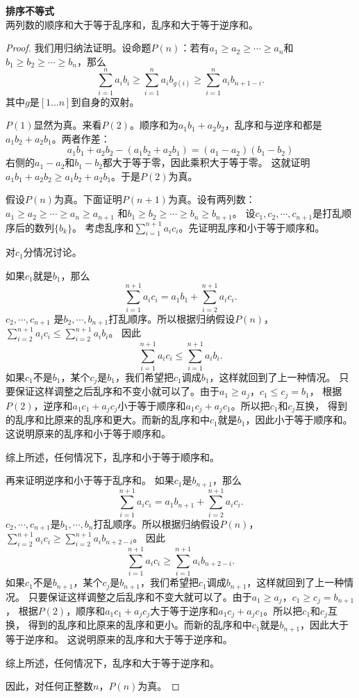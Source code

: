 \documentclass[12pt,UTF8,fontset=none]{ctexbook}
\begin{document}
\begin{tm}\textbf{排序不等式}\\
    两列数的顺序和大于等于乱序和，乱序和大于等于逆序和。
\end{tm}
\begin{proof}
    我们用归纳法证明。设命题$P(n)$：若有$a_1 \geqslant a_2 \geqslant \cdots \geqslant a_n$和
    $b_1 \geqslant b_2 \geqslant \cdots \geqslant b_n$，那么
    $$ \sum_{i=1}^n a_ib_i \geqslant \sum_{i=1}^n a_ib_{g(i)} \geqslant \sum_{i=1}^n a_ib_{n+1-i} . $$
    其中$g$是$[1\dots n]$到自身的双射。

    $P(1)$显然为真。来看$P(2)$。顺序和为$a_1b_1 + a_2b_2$，乱序和与逆序和都是$a_1b_2 + a_2b_1$。两者作差：
    $$ a_1b_1 + a_2b_2 - (a_1b_2 + a_2b_1) = (a_1 - a_2)(b_1 - b_2) $$
    右侧的$a_1-a_2$和$b_1-b_2$都大于等于零，因此乘积大于等于零。
    这就证明$a_1b_1 + a_2b_2 \geqslant a_1b_2 + a_2b_1$。于是$P(2)$为真。

    假设$P(n)$为真。下面证明$P(n+1)$为真。设有两列数：
    $a_1 \geqslant a_2 \geqslant \cdots \geqslant a_n\geqslant a_{n+1}$
    和$b_1 \geqslant b_2 \geqslant \cdots \geqslant b_n \geqslant b_{n+1}$。
    设$c_1, c_2, \cdots , c_{n+1}$是打乱顺序后的数列$\{b_k\}$。
    考虑乱序和$\sum_{i=1}^{n+1} a_i c_i$。先证明乱序和小于等于顺序和。

    对$c_{1}$分情况讨论。

    如果$c_1$就是$b_1$，那么
    $$\sum_{i=1}^{n+1} a_i c_i = a_1b_1 + \sum_{i=2}^{n+1} a_i c_i.$$
    $c_2, \cdots, c_{n+1}$
    是$b_2, \cdots, b_{n+1}$打乱顺序。所以根据归纳假设$P(n)$，
    $\sum_{i=2}^{n+1} a_i c_i \leqslant \sum_{i=2}^{n+1} a_i b_i$。
    因此
    $$\sum_{i=1}^{n+1} a_i c_i \leqslant \sum_{i=1}^{n+1} a_i b_i.$$
    如果$c_1$不是$b_1$，某个$c_j$是$b_1$，我们希望把$c_1$调成$b_1$，这样就回到了上一种情况。
    只要保证这样调整之后乱序和不变小就可以了。由于$a_1 \geqslant a_j$，$c_1 \leqslant c_j = b_1$，
    根据$P(2)$，逆序和$a_1c_1 + a_jc_j$小于等于顺序和$a_1c_j + a_jc_1$。所以把$c_1$和$c_j$互换，
    得到的乱序和比原来的乱序和更大。而新的乱序和中$c_1$就是$b_1$，因此小于等于顺序和。
    这说明原来的乱序和小于等于顺序和。

    综上所述，任何情况下，乱序和小于等于顺序和。

    再来证明逆序和小于等于乱序和。
    如果$c_1$是$b_{n+1}$，那么
    $$\sum_{i=1}^{n+1} a_i c_i = a_1b_{n+1} + \sum_{i=2}^{n+1} a_i c_i.$$
    $c_2, \cdots, c_{n+1}$是$b_1, \cdots, b_{n}$打乱顺序。所以根据归纳假设$P(n)$，
    $\sum_{i=2}^{n+1} a_i c_i \geqslant \sum_{i=2}^{n+1} a_i b_{n+2-i}$。
    因此
    $$\sum_{i=1}^{n+1} a_i c_i \geqslant \sum_{i=1}^{n+1} a_i b_{n+2-i}.$$
    如果$c_1$不是$b_{n+1}$，某个$c_j$是$b_{n+1}$，我们希望把$c_1$调成$b_{n+1}$，这样就回到了上一种情况。
    只要保证这样调整之后乱序和不变大就可以了。由于$a_1 \geqslant a_j$，$c_1 \geqslant c_j = b_{n+1}$，
    根据$P(2)$，顺序和$a_1c_1 + a_jc_j$大于等于逆序和$a_1c_j + a_jc_1$。所以把$c_1$和$c_j$互换，
    得到的乱序和比原来的乱序和更小。而新的乱序和中$c_1$就是$b_{n+1}$，因此大于等于逆序和。
    这说明原来的乱序和大于等于逆序和。

    综上所述，任何情况下，乱序和大于等于逆序和。
    
    因此，对任何正整数$n$，$P(n)$为真。
\end{proof}
\end{document}
